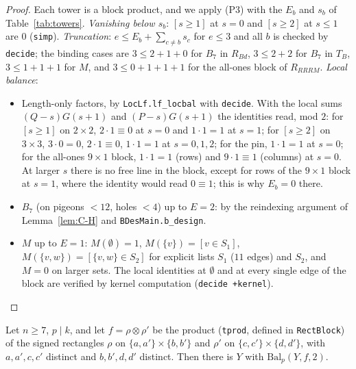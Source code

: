 \begin{proof}
Each tower is a block product, and we apply (P3) with the $E_b$ and $s_b$ of
Table~\ref{tab:towers}.
\emph{Vanishing below $s_b$}: $[s\ge1]$ at $s=0$ and $[s\ge2]$ at $s\le1$ are $0$ (\texttt{simp}).
\emph{Truncation}: $e\le E_b+\sum_{c\ne b}s_c$ for $e\le3$ and all $b$ is checked by
\texttt{decide}; the binding cases are $3\le2+1+0$ for $B_7$ in $R_{Bd}$, $3\le2+2$ for $B_7$
in $T_B$, $3\le1+1+1$ for $M$, and $3\le0+1+1+1$ for the all-ones block of $R_{RRRM}$.
\emph{Local balance}:
\begin{itemize}
\item Length-only factors, by \texttt{LocLf.lf\_locbal} with \texttt{decide}.  With the
local sums $(Q-s)G(s+1)$ and $(P-s)G(s+1)$ the identities read, mod $2$: for $[s\ge1]$ on
$2\times2$, $2\cdot1\equiv0$ at $s=0$ and $1\cdot1=1$ at $s=1$; for $[s\ge2]$ on $3\times3$,
$3\cdot0=0$, $2\cdot1\equiv0$, $1\cdot1=1$ at $s=0,1,2$; for the pin, $1\cdot1=1$ at $s=0$; for
the all-ones $9\times1$ block, $1\cdot1=1$ (rows) and $9\cdot1\equiv1$ (columns) at $s=0$.
At larger $s$ there is no free line in the block, except for rows of the $9\times1$ block at
$s=1$, where the identity would read $0\equiv1$; this is why $E_b=0$ there.
\item $B_7$ (on pigeons $<12$, holes $<4$) up to $E=2$: by the reindexing argument of
Lemma~\ref{lem:C-H} and \texttt{BDesMain.b\_design}.
\item $M$ up to $E=1$: $M(\emptyset)=1$, $M(\{v\})=[v\in S_1]$, $M(\{v,w\})=[\{v,w\}\in S_2]$
for explicit lists $S_1$ ($11$ edges) and $S_2$, and $M=0$ on larger sets.  The local
identities at $\emptyset$ and at every single edge of the block are verified by kernel
computation (\texttt{decide +kernel}).
\qedhere
\end{itemize}
\end{proof}

\begin{lemma}\label{lem:C-rect}
Let $n\ge7$, $p\mid k$, and let $f=\rho\otimes\rho'$ be the product (\texttt{tprod},
defined in \texttt{RectBlock}) of the signed rectangles $\rho$ on $\{a,a'\}\times\{b,b'\}$ and $\rho'$ on
$\{c,c'\}\times\{d,d'\}$, with $a,a',c,c'$ distinct and $b,b',d,d'$ distinct.  Then there is $Y$
with $\mathrm{Bal}_p(Y,f,2)$.
\end{lemma}

